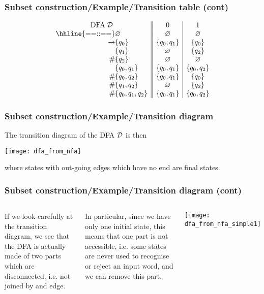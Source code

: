% 
\begin{frame}
\frametitle{Subset construction/Example/Transition table (cont)}
\[
\begin{array}{r@{}l||c|c}
\multicolumn{2}{c||}{\text{DFA} \; {\cal D}} & 0 & 1\\
\hhline{==::==}
            & \varnothing & \varnothing & \varnothing\\
\rightarrow & \{q_0\} & \{q_0, q_1\} & \{q_0\}\\
            & \{q_1\} & \varnothing & \{q_2\}\\
         \# & \{q_2\} & \varnothing & \varnothing\\
            & \{q_0, q_1\} & \{q_0,q_1\} & \{q_0,q_2\}\\
         \# & \{q_0, q_2\} & \{q_0,q_1\} & \{q_0\}\\
         \# & \{q_1, q_2\} & \varnothing & \{q_2\}\\
         \# & \{q_0, q_1, q_2\} & \{q_0, q_1\} & \{q_0,q_2\}
\end{array}
\]

\end{frame}

% 
\begin{frame}
\frametitle{Subset construction/Example/Transition diagram}

The transition diagram of the DFA \({\cal D}\) is then
\begin{center}
\texttt{[image: dfa\_from\_nfa]}
\end{center}
where states with out-going edges which have no end are final states.

\end{frame}

% 
\begin{frame}
\frametitle{Subset construction/Example/Transition diagram (cont)}

\begin{columns}

   If we look carefully at the transition
  diagram, we see that the DFA is actually made of two parts which are
  disconnected. i.e. not joined by and edge.

  \bigskip

  In particular, since we have only one initial state, this means that
  one part is not accessible, i.e. some states are never used to
  recognise or reject an input word, and we can remove this part.

  \begin{center}
    \texttt{[image: dfa\_from\_nfa\_simple1]}
  \end{center}
\end{columns}

\end{frame}

